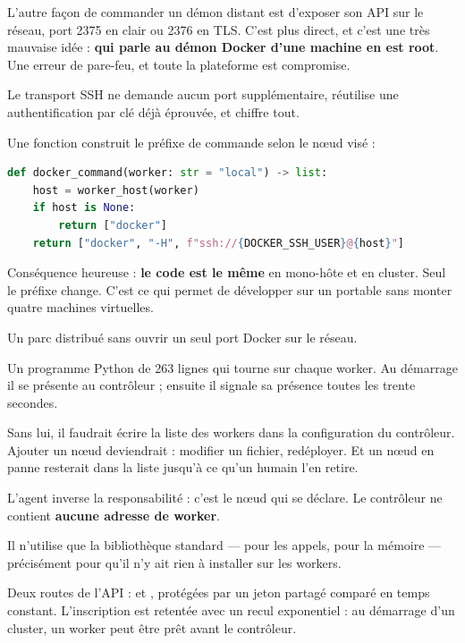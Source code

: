 \pourquoi
L'autre façon de commander un démon distant est d'exposer son API sur le réseau,
port 2375 en clair ou 2376 en TLS. C'est plus direct, et c'est une très mauvaise
idée : \textbf{qui parle au démon Docker d'une machine en est root}. Une erreur
de pare-feu, et toute la plateforme est compromise.

Le transport SSH ne demande aucun port supplémentaire, réutilise une
authentification par clé déjà éprouvée, et chiffre tout.

\role
Une fonction construit le préfixe de commande selon le nœud visé :

\begin{lstlisting}[language=Python]
def docker_command(worker: str = "local") -> list:
    host = worker_host(worker)
    if host is None:
        return ["docker"]
    return ["docker", "-H", f"ssh://{DOCKER_SSH_USER}@{host}"]
\end{lstlisting}

Conséquence heureuse : \textbf{le code est le même} en mono-hôte et en cluster.
Seul le préfixe change. C'est ce qui permet de développer sur un portable sans
monter quatre machines virtuelles.

\apport
Un parc distribué sans ouvrir un seul port Docker sur le réseau.


\quoi
Un programme Python de 263 lignes qui tourne sur chaque worker. Au démarrage il
se présente au contrôleur ; ensuite il signale sa présence toutes les trente
secondes.

\pourquoi
Sans lui, il faudrait écrire la liste des workers dans la configuration du
contrôleur. Ajouter un nœud deviendrait : modifier un fichier, redéployer. Et un
nœud en panne resterait dans la liste jusqu'à ce qu'un humain l'en retire.

L'agent inverse la responsabilité : c'est le nœud qui se déclare. Le contrôleur
ne contient \textbf{aucune adresse de worker}.

Il n'utilise que la bibliothèque standard ---  pour les appels,
 pour la mémoire --- précisément pour qu'il n'y ait rien à
installer sur les workers.

\role
Deux routes de l'API :  et
, protégées par un jeton partagé comparé en temps
constant. L'inscription est retentée avec un recul exponentiel : au démarrage
d'un cluster, un worker peut être prêt avant le contrôleur.

